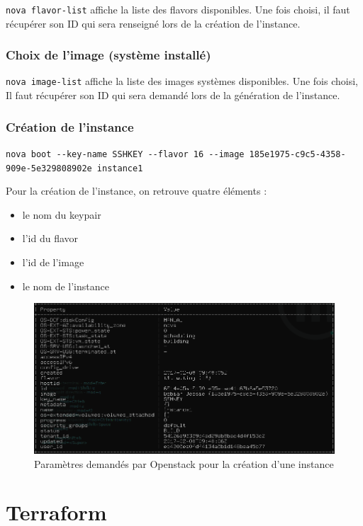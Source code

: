 \documentclass[]{article}
\begin{document}
\texttt{nova\ flavor-list} affiche la liste des flavors disponibles. Une
fois choisi, il faut récupérer son ID qui sera renseigné lors de la
création de l'instance.

\subsubsection{Choix de l'image (système
installé)}\label{choix-de-limage-systuxe8me-installuxe9}

\texttt{nova\ image-list} affiche la liste des images systèmes
disponibles. Une fois choisi, Il faut récupérer son ID qui sera demandé
lors de la génération de l'instance.

\subsubsection{Création de l'instance}\label{cruxe9ation-de-linstance-1}

\texttt{nova\ boot\ -\/-key-name\ SSHKEY\ -\/-flavor\ 16\ -\/-image\ 185e1975-c9c5-4358-909e-5e329808902e\ instance1}

Pour la création de l'instance, on retrouve quatre éléments : 
\begin{itemize}
\item le nom du keypair 
\item l'id du flavor 
\item l'id de l'image
\item le nom de l'instance
\end{itemize}
\vspace{5mm}
\begin{figure}
\centering
\includegraphics{Images/eeee.png}
\caption{Paramètres demandés par Openstack pour la création d'une instance}
\end{figure}

\newpage
\section{Terraform}\label{terraform}
\end{document}

